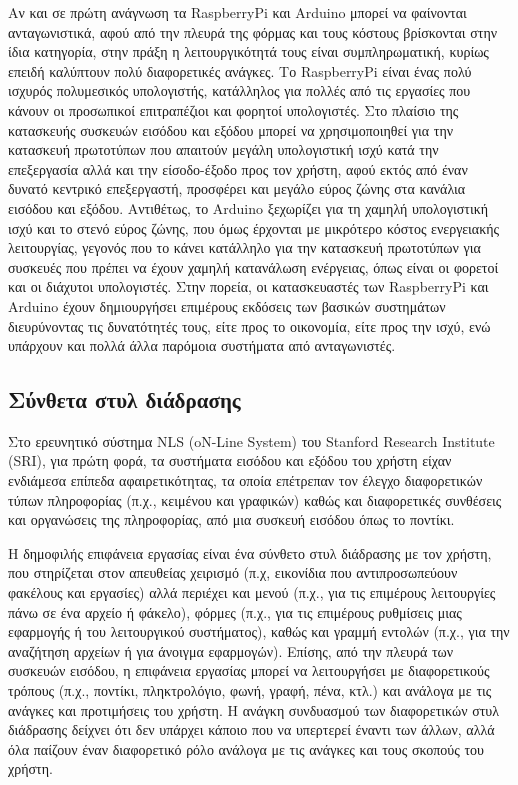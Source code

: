 \documentclass[
]{article}
\begin{document}
Αν και σε πρώτη ανάγνωση τα RaspberryPi και Arduino μπορεί να φαίνονται
ανταγωνιστικά, αφού από την πλευρά της φόρμας και τους κόστους
βρίσκονται στην ίδια κατηγορία, στην πράξη η λειτουργικότητά τους είναι
συμπληρωματική, κυρίως επειδή καλύπτουν πολύ διαφορετικές ανάγκες. Το
RaspberryPi είναι ένας πολύ ισχυρός πολυμεσικός υπολογιστής, κατάλληλος
για πολλές από τις εργασίες που κάνουν οι προσωπικοί επιτραπέζιοι και
φορητοί υπολογιστές. Στο πλαίσιο της κατασκευής συσκευών εισόδου και
εξόδου μπορεί να χρησιμοποιηθεί για την κατασκευή πρωτοτύπων που
απαιτούν μεγάλη υπολογιστική ισχύ κατά την επεξεργασία αλλά και την
είσοδο-έξοδο προς τον χρήστη, αφού εκτός από έναν δυνατό κεντρικό
επεξεργαστή, προσφέρει και μεγάλο εύρος ζώνης στα κανάλια εισόδου και
εξόδου. Αντιθέτως, το Arduino ξεχωρίζει για τη χαμηλή υπολογιστική ισχύ
και το στενό εύρος ζώνης, που όμως έρχονται με μικρότερο κόστος
ενεργειακής λειτουργίας, γεγονός που το κάνει κατάλληλο για την
κατασκευή πρωτοτύπων για συσκευές που πρέπει να έχουν χαμηλή κατανάλωση
ενέργειας, όπως είναι οι φορετοί και οι διάχυτοι υπολογιστές. Στην
πορεία, οι κατασκευαστές των RaspberryPi και Arduino έχουν δημιουργήσει
επιμέρους εκδόσεις των βασικών συστημάτων διευρύνοντας τις δυνατότητές
τους, είτε προς το οικονομία, είτε προς την ισχύ, ενώ υπάρχουν και πολλά
άλλα παρόμοια συστήματα από ανταγωνιστές.

\hypertarget{ux3c3ux3cdux3bdux3b8ux3b5ux3c4ux3b1-ux3c3ux3c4ux3c5ux3bb-ux3b4ux3b9ux3acux3b4ux3c1ux3b1ux3c3ux3b7ux3c2}{%
\subsection{Σύνθετα στυλ
διάδρασης}\label{ux3c3ux3cdux3bdux3b8ux3b5ux3c4ux3b1-ux3c3ux3c4ux3c5ux3bb-ux3b4ux3b9ux3acux3b4ux3c1ux3b1ux3c3ux3b7ux3c2}}

Στο ερευνητικό σύστημα NLS (oN-Line System) του Stanford Research
Institute (SRI), για πρώτη φορά, τα συστήματα εισόδου και εξόδου του
χρήστη είχαν ενδιάμεσα επίπεδα αφαιρετικότητας, τα οποία επέτρεπαν τον
έλεγχο διαφορετικών τύπων πληροφορίας (π.χ., κειμένου και γραφικών)
καθώς και διαφορετικές συνθέσεις και οργανώσεις της πληροφορίας, από μια
συσκευή εισόδου όπως το ποντίκι.

Η δημοφιλής επιφάνεια εργασίας είναι ένα σύνθετο στυλ διάδρασης με τον
χρήστη, που στηρίζεται στον απευθείας χειρισμό (π.χ, εικονίδια που
αντιπροσωπεύουν φακέλους και εργασίες) αλλά περιέχει και μενού (π.χ.,
για τις επιμέρους λειτουργίες πάνω σε ένα αρχείο ή φάκελο), φόρμες
(π.χ., για τις επιμέρους ρυθμίσεις μιας εφαρμογής ή του λειτουργικού
συστήματος), καθώς και γραμμή εντολών (π.χ., για την αναζήτηση αρχείων ή
για άνοιγμα εφαρμογών). Επίσης, από την πλευρά των συσκευών εισόδου, η
επιφάνεια εργασίας μπορεί να λειτουργήσει με διαφορετικούς τρόπους
(π.χ., ποντίκι, πληκτρολόγιο, φωνή, γραφή, πένα, κτλ.) και ανάλογα με
τις ανάγκες και προτιμήσεις του χρήστη. Η ανάγκη συνδυασμού των
διαφορετικών στυλ διάδρασης δείχνει ότι δεν υπάρχει κάποιο που να
υπερτερεί έναντι των άλλων, αλλά όλα παίζουν έναν διαφορετικό ρόλο
ανάλογα με τις ανάγκες και τους σκοπούς του χρήστη.
\end{document}
